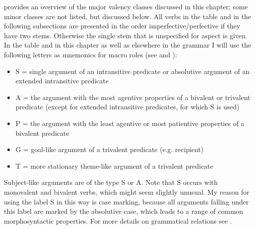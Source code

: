  provides an overview of the major valency classes discussed in this chapter; some minor classes are not listed, but discussed below. All verbs in the table and in the following subsections are presented in the order imperfective\slash perfective if they have two stems. Otherwise the single stem that is unspecified for aspect is given. In the table and in this chapter as well as elsewhere in the grammar I will use the following letters as mnemonics for macro roles (see \citet{Bickel2011} and \citet{Bickel.etal2015}): 
%
\begin{itemize}
	\item S = single argument of an intransitive predicate or absolutive argument of an extended intransitive predicate
	\item A = the argument with the most agentive properties of a bivalent or trivalent predicate (except for extended intransitive predicates, for which S is used)
	\item P = the argument with the least agentive or most patientive properties of a bivalent predicate
	\item G = goal-like argument of a trivalent predicate (e.g. recipient)
	\item T = more stationary theme-like argument of a trivalent predicate 
	\end{itemize}
Subject-like arguments are of the type S or A. Note that S occurs with monovalent and bivalent verbs, which might seem slightly unusual. My reason for using the label S in this way is case marking, because all arguments falling under this label are marked by the absolutive case, which leads to a range of common morphosyntactic properties. For more details on grammatical relations see .

